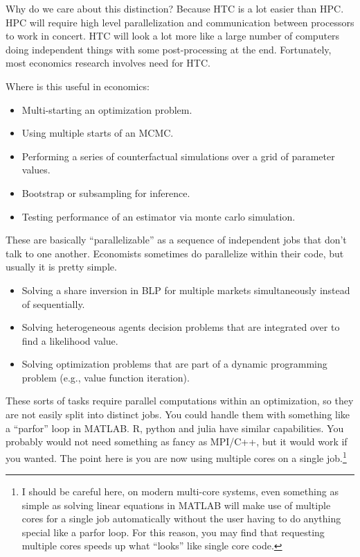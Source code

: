 \documentclass[twoside]{article}
\begin{document}
Why do we care about this distinction? Because HTC is a lot easier than HPC. HPC will require high level parallelization and communication between processors to work in concert. HTC will look a lot more like a large number of computers doing independent things with some post-processing at the end. Fortunately, most economics research involves need for HTC. 

Where is this useful in economics: 
\begin{itemize}
\item Multi-starting an optimization problem. 
\item Using multiple starts of an MCMC. 
\item Performing a series of counterfactual simulations over a grid of parameter values. 
\item Bootstrap or subsampling for inference. 
\item Testing performance of an estimator via monte carlo simulation.
\end{itemize}

These are basically ``parallelizable'' as a sequence of independent jobs that don't talk to one another.  Economists sometimes do parallelize within their code, but usually it is pretty simple.

\begin{itemize}
\item Solving a share inversion in BLP for multiple markets simultaneously instead of sequentially. 
\item Solving heterogeneous agents decision problems that are integrated over to find a likelihood value. 
\item Solving optimization problems that are part of a dynamic programming problem (e.g., value function iteration). 
\end{itemize}
 
 These sorts of tasks require parallel computations within an optimization, so they are not easily split into distinct jobs. You could handle them with something like a ``parfor'' loop in MATLAB. R, python and julia have similar capabilities. You probably would not need something as fancy as MPI/C++, but it would work if you wanted. The point here is you are now using multiple cores on a single job.\footnote{I should be careful here, on modern multi-core systems, even something as simple as solving linear equations in MATLAB will make use of multiple cores for a single job automatically without the user having to do anything special like a parfor loop. For this reason, you may find that requesting multiple cores speeds up what ``looks'' like single core code.}
 
\end{document}
